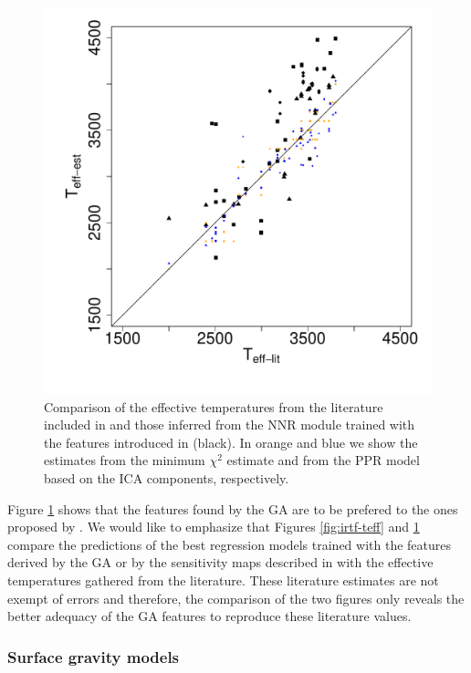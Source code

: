 \begin {figure}
 \centering
  \includegraphics[scale=0.4]{figs/irtf-CESteffs-literature}
  
  \caption{Comparison of the effective temperatures from the
  literature included in \protect\cite{cesetti} and those inferred from the
  NNR module trained with the features introduced in \protect\cite{cesetti}
  (black). In orange and blue we show the estimates from the minimum
  $\chi^2$ estimate and from the PPR model based on the ICA
  components, respectively.}

\label{fig:irtf-cesteff}
\end {figure}

Figure \ref{fig:irtf-cesteff} shows that the features found by the GA
are to be prefered to the ones proposed by \cite{cesetti}. 
We would like to emphasize that Figures \ref{fig:irtf-teff}
and \ref{fig:irtf-cesteff} compare the predictions of the best
regression models trained with the features derived by the GA or by
the sensitivity maps described in \cite{cesetti} with the effective
temperatures gathered from the literature. These literature estimates
are not exempt of errors and therefore, the comparison of the two
figures only reveals the better adequacy of the GA features to
reproduce these literature values.

\subsubsection{Surface gravity models}


